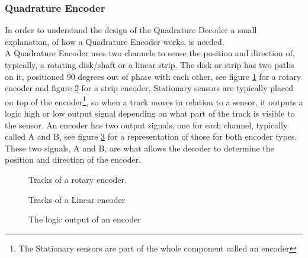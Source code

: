 \documentclass[../../../main]{subfiles}
\begin{document}
\label{subsec:Theory_encoder}
\subsubsection{Quadrature Encoder}
In order to understand the design of the Quadrature Decoder a small explanation, of how a Quadrature Encoder works, is needed. \\
A Quadrature Encoder uses two channels to sense the position and direction of, typically, a rotating disk/shaft or a linear strip. The disk or strip has two paths on it, positioned 90 degrees out of phase with each other, see figure \ref{rotary_encoder} for a rotary encoder and figure \ref{channels} for a strip encoder. Stationary sensors are typically placed on top of the encoder\footnote{The Stationary sensors are part of the whole component called an encoder}, so when a track moves in relation to a sensor, it outputs a logic high or low output signal depending on what part of the track is visible to the sensor. An encoder has two output signals, one for each channel, typically called A and B, see figure \ref{output_channels} for a representation of those  for both encoder types. These two signals, A and B, are what allows the decoder to determine the position and direction of the encoder. \cite{encoder_princpel}

\begin{figure}[H]
  \centering
  \def\svgwidth{0.4\columnwidth}
  \fontsize{9}{9}\selectfont
  
  \caption{Tracks of a rotary encoder.}
  \label{rotary_encoder}
\end{figure}

\begin{figure}[H]
  \centering
  \def\svgwidth{0.7\columnwidth}
  \fontsize{9}{9}\selectfont
  
  \caption{Tracks of a Linear encoder}
  \label{channels}
\end{figure}

\begin{figure}[H]
  \centering
  \def\svgwidth{0.7\columnwidth}
  \fontsize{9}{9}\selectfont
  
  \caption{The logic output of an encoder}
  \label{output_channels}
\end{figure}
\end{document}
